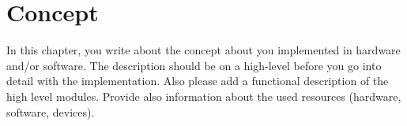 \chapter{Concept}
In this chapter, you write about the concept about you implemented in hardware and/or software. The description should be on a high-level before you go into detail with the implementation. Also please add a functional description of the high level modules. Provide also information about the used resources (hardware, software, devices).
\newpage